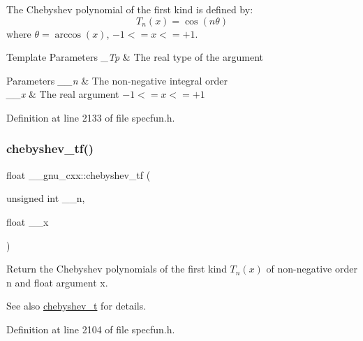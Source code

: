 The Chebyshev polynomial of the first kind is defined by\+: \[ T_n(x) = \cos(n \theta) \] where $ \theta = \arccos(x) $, $ -1 <= x <= +1 $.


\begin{DoxyTemplParams}{Template Parameters}
{\em \+\_\+\+Tp} & The real type of the argument \\
\hline
\end{DoxyTemplParams}

\begin{DoxyParams}{Parameters}
{\em \+\_\+\+\_\+n} & The non-\/negative integral order \\
\hline
{\em \+\_\+\+\_\+x} & The real argument $ -1 <= x <= +1 $ \\
\hline
\end{DoxyParams}


Definition at line 2133 of file specfun.\+h.

\mbox{\label{group__mathsf__gnu_gab8cdb55702d9c8b85af4ecc3d8c6a134}} 
\subsubsection{\texorpdfstring{chebyshev\+\_\+tf()}{chebyshev\_tf()}}
{\footnotesize\ttfamily float \+\_\+\+\_\+gnu\+\_\+cxx\+::chebyshev\+\_\+tf (\begin{DoxyParamCaption}\item[{unsigned int}]{\+\_\+\+\_\+n,  }\item[{float}]{\+\_\+\+\_\+x }\end{DoxyParamCaption})\hspace{0.3cm}{\ttfamily [inline]}}

Return the Chebyshev polynomials of the first kind $ T_n(x) $ of non-\/negative order {\ttfamily n} and {\ttfamily float} argument {\ttfamily x}.

\begin{DoxySeeAlso}{See also}
\hyperlink{group__mathsf__gnu_ga4d9cae9de13a64ceeb4fb0226f4b7844}{chebyshev\+\_\+t} for details. 
\end{DoxySeeAlso}


Definition at line 2104 of file specfun.\+h.


